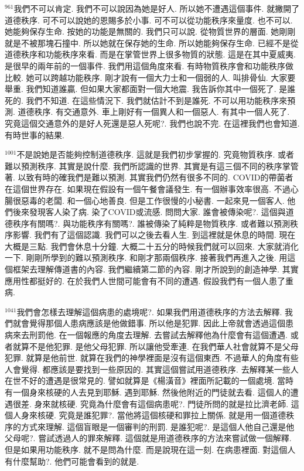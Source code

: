 \documentclass{book}
\begin{document}
$^{961}$我們不可以肯定.
我們不可以說因為她是好人.
所以她不遭遇這個事件.
就撇開了道德秩序.
可不可以說她的恩賜多於小事.
可不可以從功能秩序來量度.
也不可以.
她能夠保存生命.
按她的功能是無關的.
我們只可以說.
從物質世界的層面.
她剛剛就是不被那塊石撞中.
所以她就在保存她的生命.
所以她能夠保存生命.
已經不是從道德秩序和功能秩序來看.
而是在掌管世界上很多物質的狀態.
這是在其中夏威夷.
是很早的兩年前的一個事件.
我們用這個角度來看.
有時物質秩序會和功能秩序做比較.
她可以跨越功能秩序.
剛才說有一個大力士和一個弱的人.
叫排骨仙.
大家要舉重.
我們知道誰贏.
但如果大家都面對一個大地震.
我告訴你其中一個死了.
是誰死的.
我們不知道.
在這些情況下.
我們就估計不到是誰死.
不可以用功能秩序來預測.
道德秩序.
有交通意外.
車上剛好有一個異人和一個惡人.
有其中一個人死了.
究竟這個交通意外的是好人死還是惡人死呢?.
我們也說不完.
在這裡我們也會知道.
有時世事的結果.

$^{1001}$不是說她是否能夠控制道德秩序.
這就是我們初步掌握的.
究竟物質秩序.
或者難以預測秩序.
其實是說什麼.
我們所認識的世界.
其實是有這三個不同的秩序掌管著.
以致有時的確我們是難以預測.
其實我們仍然有很多不同的.
COVID的帶菌者在這個世界存在.
如果現在假設有一個午餐會議發生.
有一個辦事效率很高.
不過心腸很惡毒的老闆.
和一個心地善良.
但是工作很慢的小秘書.
一起來見一個客人.
他們後來發現客人染了病.
染了COVID或流感.
問問大家.
誰會被傳染呢?.
這個與道德秩序有關嗎?.
與功能秩序有關嗎?.
誰被傳染了純粹是物質秩序.
或者難以預測秩序影響.
我們有了這個認識.
我們可以之後去看人生.
到這裡就是休息的時間.
現在大概是三點.
我們會休息十分鐘.
大概二十五分的時候我們就可以回來.
大家就消化一下.
剛剛所學到的難以預測秩序.
和剛才那兩個秩序.
接著我們再進入之後.
用這個框架去理解傳道書的內容.
我們繼續第二節的內容.
剛才所說到的創造神學.
其實應用性都挺好的.
在於我們人世間可能會有不同的遭遇.
假設我們有一個人患了重病.

$^{1041}$我們會怎樣去理解這個病患的處境呢?.
如果我們用道德秩序的方法去解釋.
我們就會覺得那個人患病應該是他做錯事.
所以他是犯罪.
因此上帝就會透過這個患病來去刑罰他.
在一個報應的角度去理解.
去嘗試去解釋他為什麼會有這個遭遇.
或者就算不是他犯罪.
是他父母犯罪.
所以讓他受牽連.
在我們華人社會就算不是父母犯罪.
就算是他前世.
就算在我們的神學裡面是沒有這個東西.
不過華人的角度有些人會覺得.
都應該是要找到一些原因的.
其實這個嘗試用道德秩序.
去解釋某一些人在世不好的遭遇是很常見的.
譬如就算是《楊潢音》裡面所記載的一個處境.
當時有一個身來核硬的人去見到耶穌.
遇到耶穌.
然後他附近的門徒就去看.
這個人的遭遇很差.
身來就核硬.
究竟為什麼會有這個病患呢?.
門徒所問的就是拉比濟老師.
這個人身來核硬.
究竟是誰犯罪?.
當他將這個核硬和罪拉上關係.
就是用一個道德秩序的方式來理解.
這個盲眼是一個審判的刑罰.
是誰犯呢?.
是這個人他自己還是他父母呢?.
嘗試透過人的罪來解釋.
這個就是用道德秩序的方法來嘗試做一個解釋.
但是如果用功能秩序.
就不是問為什麼.
而是說現在這一刻.
在病患裡面.
對這個人有什麼幫助?.
他們可能會看到的就是.
\end{document}
